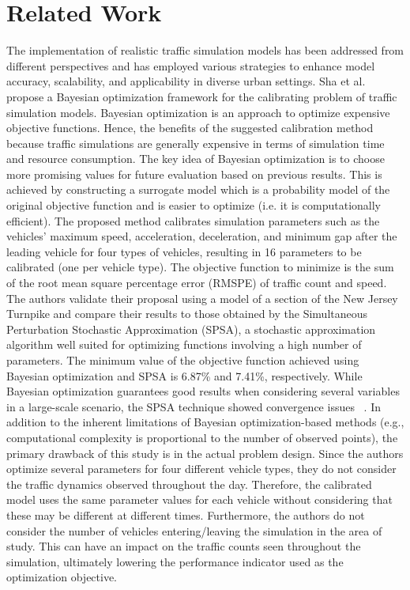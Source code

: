 \section{Related Work}
\label{sec:relatedwork}

The implementation of realistic traffic simulation models has been addressed from different perspectives and has employed various strategies to enhance model accuracy, scalability, and applicability in diverse urban settings. Sha et al.~\cite{sha2020applying} propose a Bayesian optimization framework for the calibrating problem of traffic simulation models. Bayesian optimization is an approach to optimize expensive objective functions. Hence, the benefits of the suggested calibration method because traffic simulations are generally expensive in terms of simulation time and resource consumption. The key idea of Bayesian optimization is to choose more promising values for future evaluation based on previous results. This is achieved by constructing a surrogate model which is a probability model of the original objective function and is easier to optimize (i.e. it is computationally efficient). The proposed method calibrates simulation parameters such as the vehicles' maximum speed, acceleration, deceleration, and minimum gap after the leading vehicle for four types of vehicles, resulting in 16 parameters to be calibrated (one per vehicle type). The objective function to minimize is the sum of the root mean square percentage error (RMSPE) of traffic count and speed. The authors validate their proposal using a model of a section of the New Jersey Turnpike and compare their results to those obtained by the Simultaneous Perturbation Stochastic Approximation (SPSA), a stochastic approximation algorithm well suited for optimizing functions involving a high number of parameters. The minimum value of the objective function achieved using Bayesian optimization and SPSA is 6.87\% and 7.41\%, respectively. While Bayesian optimization guarantees good results when considering several variables in a large-scale scenario, the SPSA technique showed convergence issues ~\cite{kostic_techniques_2017}. In addition to the inherent limitations of Bayesian optimization-based methods (e.g., computational complexity is proportional to the number of observed points), the primary drawback of this study is in the actual problem design. Since the authors optimize several parameters for four different vehicle types, they do not consider the traffic dynamics observed throughout the day. Therefore, the calibrated model uses the same parameter values for each vehicle without considering that these may be different at different times. Furthermore, the authors do not consider the number of vehicles entering/leaving the simulation in the area of study. This can have an impact on the traffic counts seen throughout the simulation, ultimately lowering the performance indicator used as the optimization objective.

